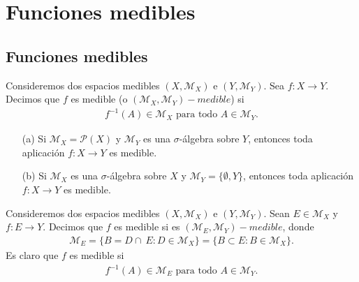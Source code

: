 \chapter{Funciones medibles}
\section{Funciones medibles}

\begin{defi}
Consideremos dos espacios medibles $(X, \mathcal{M}_X)$ e $(Y, \mathcal{M}_Y)$. Sea $f : X \longrightarrow Y$. Decimos que $f$ es medible (o $(\mathcal{M}_X, \mathcal{M}_Y)-medible$) si
\begin{align*}
    f^{-1}(A) \in \mathcal{M}_X \text{ para todo } A \in \mathcal{M}_Y.
\end{align*}
\end{defi}

\begin{ejemplo}
\begin{enumerate}
    \item[(a)] Si $\mathcal{M}_X = \mathcal{P}(X)$ y $\mathcal{M}_Y$ es una $\sigma$-álgebra sobre $Y$, entonces toda aplicación $f: X \longrightarrow Y$ es medible.
    \item[(b)] Si  $\mathcal{M}_X$ es una $\sigma$-álgebra sobre $X$ y $\mathcal{M}_Y = \{ \emptyset, Y \}$, entonces toda aplicación $f: X \longrightarrow Y$ es medible.
\end{enumerate}
\end{ejemplo}
\begin{defi}
Consideremos dos espacios medibles $(X, \mathcal{M}_X)$ e $(Y, \mathcal{M}_Y)$. Sean $E \in \mathcal{M}_X$ y $f : E \longrightarrow Y$. Decimos que $f$ es medible si es $(\mathcal{M}_E, \mathcal{M}_Y)-medible$, donde
\begin{align*}
    \mathcal{M}_E = \{ B = D \cap \ E : D \in \mathcal{M}_X \} = \{ B \subset E : B \in \mathcal{M}_X \}.
\end{align*}
Es claro que $f$ es medible si
\begin{align*}
    f^{-1}(A) \in \mathcal{M}_E \text{ para todo } A \in \mathcal{M}_Y.
\end{align*}
\end{defi}

